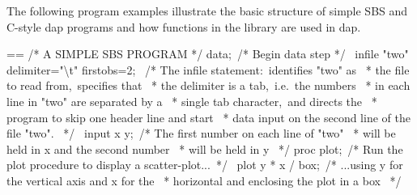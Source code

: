 \documentclass{book}
\makeatletter
\newenvironment{Texinfopreformatted}{%
  \par\GNUTobeylines\obeyspaces\frenchspacing\parskip=\z@\parindent=\z@}{}
{\catcode`\^^M=13 \gdef\GNUTobeylines{\catcode`\^^M=13 \def^^M{\null\par}}}
\newenvironment{Texinfoindented}{\begin{list}{}{}\item\relax}{\end{list}}
\renewcommand{\_}{\Texinfounderscore\discretionary{}{}{}}
\makeatother
\begin{document}
The following program examples illustrate the basic structure
of simple SBS and C-style dap programs and how functions in the library are used in dap.

\begin{Texinfoindented}
\begin{Texinfopreformatted}%
\ttfamily /* A SIMPLE SBS PROGRAM */
data;\                  /* Begin data step */
\ infile "two" delimiter="\textbackslash{}t" firstobs=2;
\                       /* The infile statement:\ identifies "two" as
\                        * the file to read from,\ specifies that
\                        * the delimiter is a tab,\ i.e.\ the numbers
\                        * in each line in "two" are separated by a
\                        * single tab character,\ and directs the
\                        * program to skip one header line and start
\                        * data input on the second line of the file "two".
\                        */
\ input x y;\            /* The first number on each line of "two"
\                        * will be held in x and the second number
\                        * will be held in y
\                        */
proc plot;\             /* Run the plot procedure to display a scatter-plot...\ */
\ plot y * x / box;\     /* ...using y for the vertical axis and x for the
\                        * horizontal and enclosing the plot in a box
\                        */

\end{Texinfopreformatted}
\end{Texinfoindented}
\end{document}

